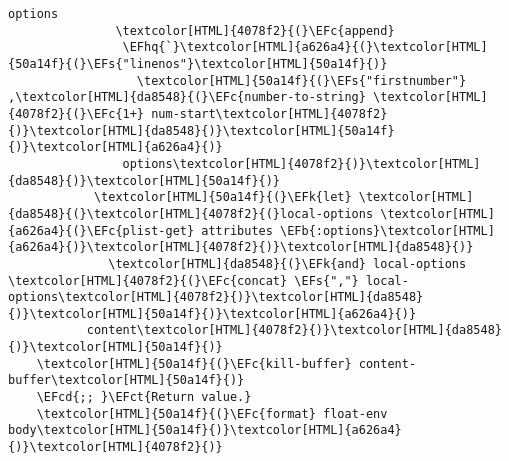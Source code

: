 \documentclass{scrartcl}
\newcommand{\EFk}[1]{\textcolor{EFk}{#1}} %
\newcommand{\EFs}[1]{\textcolor{EFs}{#1}} %
\newcommand{\EFb}[1]{\textcolor{EFb}{#1}} %
\newcommand{\EFct}[1]{\textcolor{EFct}{#1}} %
\newcommand{\EFc}[1]{\textcolor{EFc}{#1}} %
\newcommand{\EFcd}[1]{\textcolor{EFcd}{#1}} %
\newcommand{\EFhq}[1]{\textcolor{EFhq}{#1}} %
\begin{document}
\begin{enumerate}
\begin{Code}
\begin{Verbatim}[]
                 options
               \textcolor[HTML]{4078f2}{(}\EFc{append}
                \EFhq{`}\textcolor[HTML]{a626a4}{(}\textcolor[HTML]{50a14f}{(}\EFs{"linenos"}\textcolor[HTML]{50a14f}{)}
                  \textcolor[HTML]{50a14f}{(}\EFs{"firstnumber"} ,\textcolor[HTML]{da8548}{(}\EFc{number-to-string} \textcolor[HTML]{4078f2}{(}\EFc{1+} num-start\textcolor[HTML]{4078f2}{)}\textcolor[HTML]{da8548}{)}\textcolor[HTML]{50a14f}{)}\textcolor[HTML]{a626a4}{)}
                options\textcolor[HTML]{4078f2}{)}\textcolor[HTML]{da8548}{)}\textcolor[HTML]{50a14f}{)}
            \textcolor[HTML]{50a14f}{(}\EFk{let} \textcolor[HTML]{da8548}{(}\textcolor[HTML]{4078f2}{(}local-options \textcolor[HTML]{a626a4}{(}\EFc{plist-get} attributes \EFb{:options}\textcolor[HTML]{a626a4}{)}\textcolor[HTML]{4078f2}{)}\textcolor[HTML]{da8548}{)}
              \textcolor[HTML]{da8548}{(}\EFk{and} local-options \textcolor[HTML]{4078f2}{(}\EFc{concat} \EFs{","} local-options\textcolor[HTML]{4078f2}{)}\textcolor[HTML]{da8548}{)}\textcolor[HTML]{50a14f}{)}\textcolor[HTML]{a626a4}{)}
           content\textcolor[HTML]{4078f2}{)}\textcolor[HTML]{da8548}{)}\textcolor[HTML]{50a14f}{)}
    \textcolor[HTML]{50a14f}{(}\EFc{kill-buffer} content-buffer\textcolor[HTML]{50a14f}{)}
    \EFcd{;; }\EFct{Return value.}
    \textcolor[HTML]{50a14f}{(}\EFc{format} float-env body\textcolor[HTML]{50a14f}{)}\textcolor[HTML]{a626a4}{)}\textcolor[HTML]{4078f2}{)}


\end{Verbatim}
\end{Code}
\end{enumerate}
\end{document}
